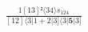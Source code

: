 \documentclass[varwidth, border=5pt]{standalone}
\begin{document}
\begin{my}
$\begin{gathered}
\scriptscriptstyle\frac{1[13]²⟨34⟩s_{124}}{[12]⟨3|1+2|3]⟨3|𝟓|3]}
\end{gathered}$
\end{my}
\end{document}
